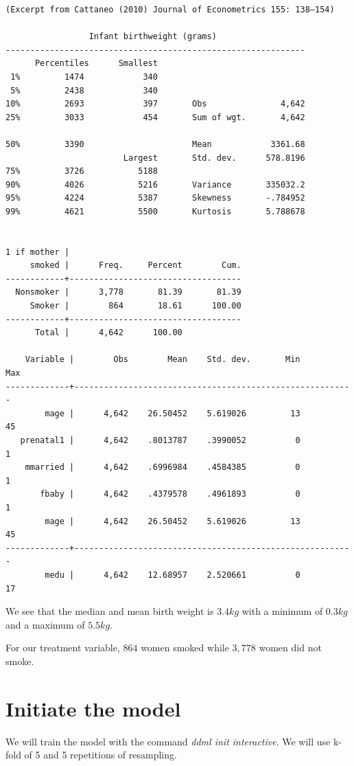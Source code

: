 \documentclass[
]{book}
\begin{document}
\begin{verbatim}
(Excerpt from Cattaneo (2010) Journal of Econometrics 155: 138–154)

                 Infant birthweight (grams)
-------------------------------------------------------------
      Percentiles      Smallest
 1%         1474            340
 5%         2438            340
10%         2693            397       Obs               4,642
25%         3033            454       Sum of wgt.       4,642

50%         3390                      Mean            3361.68
                        Largest       Std. dev.      578.8196
75%         3726           5188
90%         4026           5216       Variance       335032.2
95%         4224           5387       Skewness       -.784952
99%         4621           5500       Kurtosis       5.788678


1 if mother |
     smoked |      Freq.     Percent        Cum.
------------+-----------------------------------
  Nonsmoker |      3,778       81.39       81.39
     Smoker |        864       18.61      100.00
------------+-----------------------------------
      Total |      4,642      100.00

    Variable |        Obs        Mean    Std. dev.       Min        Max
-------------+---------------------------------------------------------
        mage |      4,642    26.50452    5.619026         13         45
   prenatal1 |      4,642    .8013787    .3990052          0          1
    mmarried |      4,642    .6996984    .4584385          0          1
       fbaby |      4,642    .4379578    .4961893          0          1
        mage |      4,642    26.50452    5.619026         13         45
-------------+---------------------------------------------------------
        medu |      4,642    12.68957    2.520661          0         17
\end{verbatim}

We see that the median and mean birth weight is \(3.4 kg\) with a minimum of \(0.3 kg\) and a maximum of \(5.5 kg\).

For our treatment variable, \(864\) women smoked while \(3,778\) women did not smoke.

\section{Initiate the model}\label{initiate-the-model-1}

We will train the model with the command \emph{ddml init interactive}. We will use k-fold of 5 and 5 repetitions of resampling.
\end{document}
